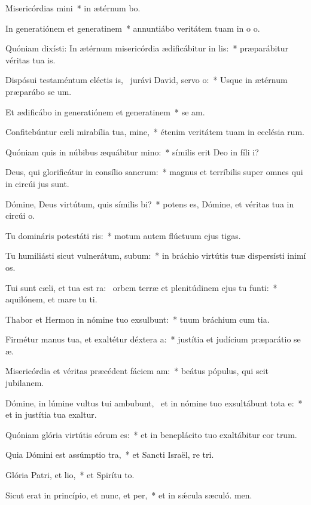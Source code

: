 \item Misericórdias mini~* in ætérnum bo.
\item In generatiónem et generatinem~* annuntiábo veritátem tuam in o o.
\item Quóniam dixísti: In ætérnum misericórdia ædificábitur in lis:~* præparábitur véritas tua  is.
\item Dispósui testaméntum eléctis is,~\pscross{} jurávi David, servo o:~* Usque in ætérnum præparábo se um.
\item Et ædificábo in generatiónem et generatinem~* se am.
\item Confitebúntur cæli mirabília tua, mine,~* étenim veritátem tuam in ecclésia rum.
\item Quóniam quis in núbibus æquábitur mino:~* símilis erit Deo in fíli i?
\item Deus, qui glorificátur in consílio sancrum:~* magnus et terríbilis super omnes qui in circúi jus sunt.
\item Dómine, Deus virtútum, quis símilis bi?~* potens es, Dómine, et véritas tua in circúi o.
\item Tu domináris potestáti ris:~* motum autem flúctuum ejus  tigas.
\item Tu humiliásti sicut vulnerátum, subum:~* in bráchio virtútis tuæ dispersísti inimí os.
\item Tui sunt cæli, et tua est ra:~\pscross{} orbem terræ et plenitúdinem ejus tu funti:~* aquilónem, et mare tu ti.
\item Thabor et Hermon in nómine tuo exsulbunt:~* tuum bráchium cum tia.
\item Firmétur manus tua, et exaltétur déxtera a:~* justítia et judícium præparátio se æ.
\item Misericórdia et véritas præcédent fáciem am:~* beátus pópulus, qui scit jubilanem.
\item Dómine, in lúmine vultus tui ambubunt,~\pscross{} et in nómine tuo exsultábunt tota e:~* et in justítia tua exaltur.
\item Quóniam glória virtútis eórum  es:~* et in beneplácito tuo exaltábitur cor trum.
\item Quia Dómini est assúmptio tra,~* et Sancti Israël, re tri.
\item Glória Patri, et lio,~* et Spirítu to.
\item Sicut erat in princípio, et nunc, et per,~* et in sǽcula sæculó. men.
